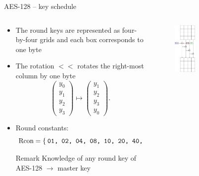 \begin{frame}{AES-128 -- key schedule}
\begin{columns}[T] %
\begin{column}{.65\textwidth}
\begin{itemize}
    \item The round keys are represented as four-by-four grids and each box corresponds to one byte
    \item The rotation $<<$ rotates the right-most column by one byte
\[
\begin{pmatrix}
    y_0\\
    y_1\\
    y_2\\
    y_3
\end{pmatrix}
\mapsto
\begin{pmatrix}
    y_1\\
    y_2\\
    y_3\\
    y_0
\end{pmatrix}.
\]
\item Round constants:
\[
\text{Rcon}=\Set{\texttt{01, 02, 04, 08, 10, 20, 40, 80, 1B, 36}}.
\]
\begin{alertblock}{Remark}
Knowledge of any round key of AES-128 $\to$ master key
\end{alertblock}
\end{itemize}
\end{column}%
\begin{column}{.68\textwidth}
\begin{figure}[htb]
    \centering
    \includegraphics[width=0.34\textwidth]{fig/AES_KS.pdf}
\end{figure}
\end{column}%
\end{columns}
\end{frame}


